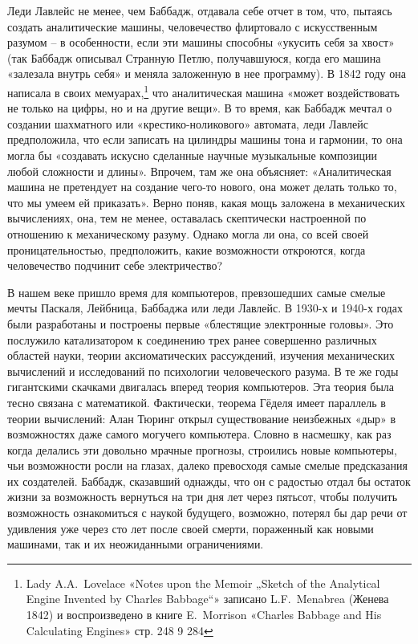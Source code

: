 \documentclass[../main.tex]{subfiles}
\begin{document}
Леди Лавлейс не менее, чем Баббадж, отдавала себе отчет в том, что, пытаясь создать аналитические машины, человечество флиртовало с искусственным разумом \--- в особенности, если эти машины способны «укусить себя за хвост» (так Баббадж описывал Странную Петлю, получавшуюся, когда его машина «залезала внутрь себя» и меняла заложенную в нее программу). В 1842 году она написала в своих мемуарах,\footnote{Lady A.A.~Lovelace «Notes upon the Memoir „Sketch of the Analytical Engine Invented by Charles Babbage``» записано L.F.~Menabrea (Женева 1842) и воспроизведено в книге E.~Morrison «Charles Babbage and His Calculating Engines» стр. 248 9 284} что аналитическая машина «может воздействовать не только на цифры, но и на другие вещи». В то время, как Баббадж мечтал о создании шахматного или «крестико-ноликового» автомата, леди Лавлейс предположила, что если записать на цилиндры машины тона и гармонии, то она могла бы «создавать искусно сделанные научные музыкальные композиции любой сложности и длины». Впрочем, там же она объясняет: «Аналитическая машина не претендует на создание чего-то нового, она может делать только то, что мы умеем ей приказать». Верно поняв, какая мощь заложена в механических вычислениях, она, тем не менее, оставалась скептически настроенной по отношению к механическому разуму. Однако могла ли она, со всей своей проницательностью, предположить, какие возможности откроются, когда человечество подчинит себе электричество?

В нашем веке пришло время для компьютеров, превзошедших самые смелые мечты Паскаля, Лейбница, Баббаджа или леди Лавлейс. В 1930-х и 1940-х годах были разработаны и построены первые «блестящие электронные головы». Это послужило катализатором к соединению трех ранее совершенно различных областей науки, теории аксиоматических рассуждений, изучения механических вычислений и исследований по психологии человеческого разума. В те же годы гигантскими скачками двигалась вперед теория компьютеров. Эта теория была тесно связана с математикой. Фактически, теорема Гёделя имеет параллель в теории вычислений: Алан Тюринг открыл существование неизбежных «дыр» в возможностях даже самого могучего компьютера. Словно в насмешку, как раз когда делались эти довольно мрачные прогнозы, строились новые компьютеры, чьи возможности росли на глазах, далеко превосходя самые смелые предсказания их создателей. Баббадж, сказавший однажды, что он с радостью отдал бы остаток жизни за возможность вернуться на три дня лет через пятьсот, чтобы получить возможность ознакомиться с наукой будущего, возможно, потерял бы дар речи от удивления уже через сто лет после своей смерти, пораженный как новыми машинами, так и их неожиданными ограничениями.
\end{document}

